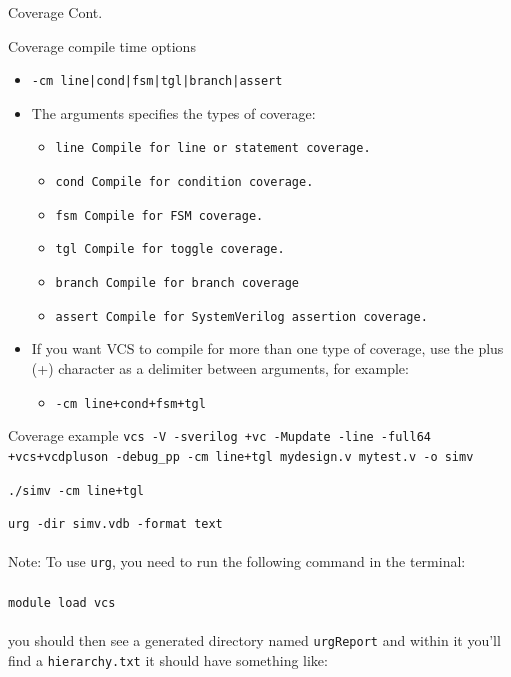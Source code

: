 \documentclass[dvipsnames]{beamer}
\begin{document}
\begin{frame}{Coverage Cont.}
    \begin{block}{Coverage compile time options}
        \begin{itemize}
        
            \item \texttt{-cm line|cond|fsm|tgl|branch|assert}
            \item The arguments specifies the types of coverage:
                \begin{itemize}
                    \item \texttt{line   Compile for line or statement coverage.}
                    \item \texttt{cond   Compile for condition coverage.}
                    \item \texttt{fsm    Compile for FSM coverage.}
                    \item \texttt{tgl    Compile for toggle coverage.}
                    \item \texttt{branch Compile for branch coverage}
                    \item \texttt{assert Compile for SystemVerilog assertion coverage.}
                \end{itemize}
             \item If you want VCS to compile for more than one type of coverage, use the plus (+) character as a delimiter between arguments, for example:
                \begin{itemize}
                    \item \texttt{-cm line+cond+fsm+tgl}
                \end{itemize}
        \end{itemize}
    \end{block}
\end{frame}
\begin{frame}{Coverage example}
    \texttt{vcs -V -sverilog +vc -Mupdate -line -full64 +vcs+vcdpluson -debug\_{pp} -cm line+tgl mydesign.v mytest.v -o simv}
    
    \texttt{./simv -cm line+tgl}
    
    \texttt{urg -dir simv.vdb -format text}
    \\
    \\
    Note: To use \texttt{urg}, you need to run the following command in the terminal:
    \\
    \\
    \texttt{module load vcs} 
    \\
    \\
    you should then see a generated directory named \texttt{urgReport} and within it you'll find a \texttt{hierarchy.txt}
    it should have something like:
\end{frame}
\end{document}

